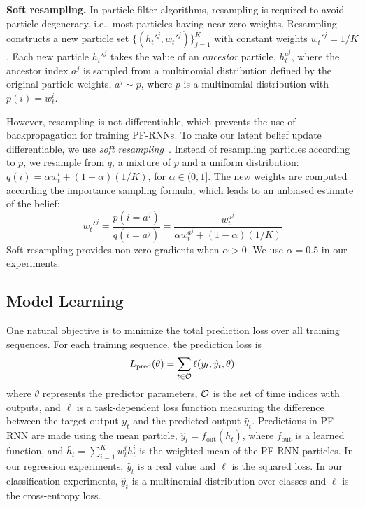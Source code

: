 \documentclass[letterpaper]{article} %
\begin{document}
\textbf{Soft resampling.} In particle filter algorithms, resampling is required to avoid particle degeneracy, i.e., most particles having near-zero weights. 
Resampling constructs a new particle set $\{ (h_t'^j,w_t'^j) \}_{j=1}^K$ with constant weights $w_t'^j = 1/K$. Each new particle $h_{t}'^j$ takes the value of an \emph{ancestor} particle, $h_t^{a^j}$, where the ancestor index $a^j$ is sampled from a multinomial distribution defined by the original particle weights, $a^j \sim p$,
where $p$ is a multinomial distribution with $p(i) = w_t^i$.

However, resampling is not differentiable, which prevents the use of backpropagation for training PF-RNNs. 
To make our latent belief update differentiable, we use  \emph{soft resampling}~\cite{karkus2018particle}. Instead of resampling particles according to %
$p$, we resample from $q$, a mixture of $p$ and a uniform distribution:
$
q(i) = \alpha w_t^i + (1 - \alpha) (1/ K)
$, for 
$\alpha \in (0,1]$.
The new weights are computed according the importance sampling formula, which leads to an unbiased estimate of the belief:
\begin{equation}
	w_{t}'^j = \frac{p(i=a^j)}{q(i=a^j)} = \frac{w_t^{a^j}}{\alpha w_t^{a^j} + (1-\alpha) (1/K)}
\end{equation}
Soft resampling provides non-zero gradients when $\alpha > 0$. We use $\alpha=0.5$ in our experiments.

\subsection{Model Learning}
\label{sec:model_learning}

One natural objective is to minimize the total prediction loss over all training sequences. For each training sequence, the prediction loss is 
\begin{equation}
	L_\mathrm{pred}(\theta) = \sum_{t\in \cal{O}} \ell(y_t,\hat{y}_t, \theta)
\end{equation}
where $\theta$ represents the predictor parameters,
$\cal{O}$ is the set of time indices with outputs,  and $\ell$ is a task-dependent loss function measuring the difference between the target output $y_t$ and the predicted output $\hat{y}_t$. 
Predictions in PF-RNN are made using the mean particle, $\hat{y}_t = f_\mathrm{out}(\bar{h}_t)$, where $f_\mathrm{out}$ is a learned function, and $\bar{h}_t = \sum_{i=1}^K w_t^i h_t^i$ is the weighted mean of the PF-RNN particles.
In our regression experiments, $\hat{y}_t$ is a real value and $\ell$ is the squared loss. In our classification experiments, $\hat{y}_t$ is a multinomial distribution over classes and $\ell$ is the cross-entropy loss.
\end{document}
